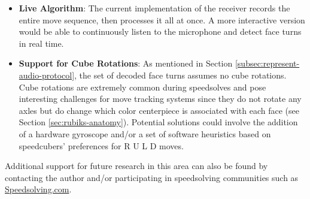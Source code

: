 \begin{itemize}

    \item \textbf{Live Algorithm}: The current implementation of the
    receiver records the entire move sequence, then processes it all at
    once. A more interactive version would be able to continuously
    listen to the microphone and detect face turns in real time.

    \item \textbf{Support for Cube Rotations}: As mentioned in Section
    \ref{subsec:represent-audio-protocol}, the set of decoded face
    turns assumes no cube rotations. Cube rotations are extremely
    common during speedsolves and pose interesting challenges for move
    tracking systems since they do not rotate any axles but do change
    which color centerpiece is associated with each face (see Section
    \ref{sec:rubiks-anatomy}). Potential solutions could involve the
    addition of a hardware gyroscope and/or a set of software
    heuristics based on speedcubers' preferences for R U L D moves.

\end{itemize}

Additional support for future research in this area can also be found
by contacting the author and/or participating in speedsolving
communities such as
\href{https://www.speedsolving.com/}{Speedsolving.com}.